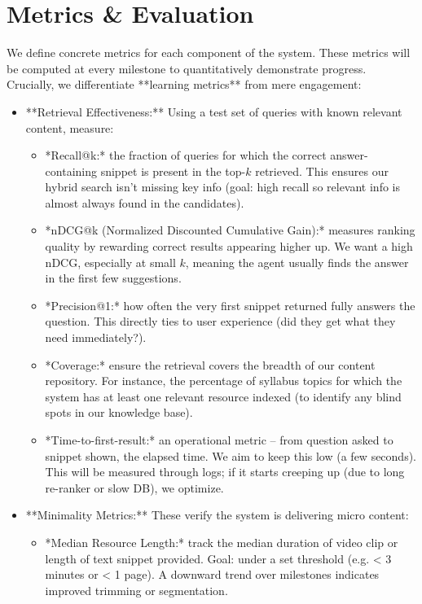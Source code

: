 \documentclass[11pt]{article}
\begin{document}
\section{Metrics \& Evaluation}
We define concrete metrics for each component of the system. These metrics will be computed at every milestone to quantitatively demonstrate progress. Crucially, we differentiate **learning metrics** from mere engagement:
\begin{itemize}
  \item **Retrieval Effectiveness:** Using a test set of queries with known relevant content, measure:
    \begin{itemize}
      \item *Recall@k:* the fraction of queries for which the correct answer-containing snippet is present in the top-$k$ retrieved. This ensures our hybrid search isn’t missing key info (goal: high recall so relevant info is almost always found in the candidates).
      \item *nDCG@k (Normalized Discounted Cumulative Gain):* measures ranking quality by rewarding correct results appearing higher up. We want a high nDCG, especially at small $k$, meaning the agent usually finds the answer in the first few suggestions.
      \item *Precision@1:* how often the very first snippet returned fully answers the question. This directly ties to user experience (did they get what they need immediately?).
      \item *Coverage:* ensure the retrieval covers the breadth of our content repository. For instance, the percentage of syllabus topics for which the system has at least one relevant resource indexed (to identify any blind spots in our knowledge base).
      \item *Time-to-first-result:* an operational metric – from question asked to snippet shown, the elapsed time. We aim to keep this low (a few seconds). This will be measured through logs; if it starts creeping up (due to long re-ranker or slow DB), we optimize.
    \end{itemize}
  \item **Minimality Metrics:** These verify the system is delivering micro content:
    \begin{itemize}
      \item *Median Resource Length:* track the median duration of video clip or length of text snippet provided. Goal: under a set threshold (e.g. < 3 minutes or < 1 page). A downward trend over milestones indicates improved trimming or segmentation.

\end{itemize}
\end{itemize}
\end{document}
